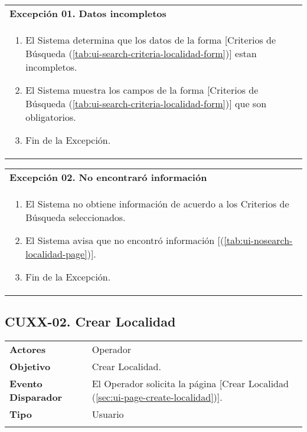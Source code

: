 \begin{tabular}{ p{15.5cm} }
	\textbf{Excepción 01. Datos incompletos} \\
	\begin{enumerate}
		\item El Sistema determina que los datos de la forma [Criterios de Búsqueda (\ref{tab:ui-search-criteria-localidad-form})] estan incompletos.
		\item El Sistema muestra los campos de la forma [Criterios de Búsqueda (\ref{tab:ui-search-criteria-localidad-form})] que son obligatorios.
		\item Fin de la Excepción.
	\end{enumerate}
\end{tabular}

\begin{tabular}{ p{15.5cm} }
	\textbf{Excepción 02. No encontraró información} \\
	\begin{enumerate}
		\item El Sistema no obtiene información de acuerdo a los Criterios de Búsqueda seleccionados.
		\item El Sistema avisa que no encontró información [(\ref{tab:ui-nosearch-localidad-page})].
		\item Fin de la Excepción.
	\end{enumerate}
\end{tabular}


\clearpage
\subsection{CUXX-02. Crear Localidad} \label{sec:cu-create-Localidad}

\begin{tabular}{ p{3.5cm} p{11.5cm} }
	\textbf{Actores} & Operador\\
	\textbf{Objetivo} & Crear Localidad.\\
	\textbf{Evento Disparador} & El Operador solicita la página [Crear Localidad (\ref{sec:ui-page-create-localidad})].\\
	\textbf{Tipo} & Usuario\\
	\\
\end{tabular}

